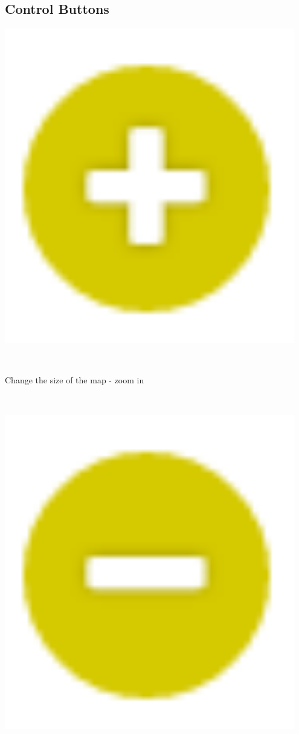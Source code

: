 \subsection{Control Buttons} %
\label{sub:control_buttons}
\begin{minipage}{0.05\textwidth}
	\includegraphics[width=0.95\textwidth]{graphics/plus.png}
\end{minipage}
\label{fig:controll_button_plus}
~
\begin{minipage}{0.94\textwidth}
	Change the size of the map - zoom in\\
\end{minipage}
~
\begin{minipage}{0.05\textwidth}
	\includegraphics[width=0.95\textwidth]{graphics/minus.png}
\end{minipage}
